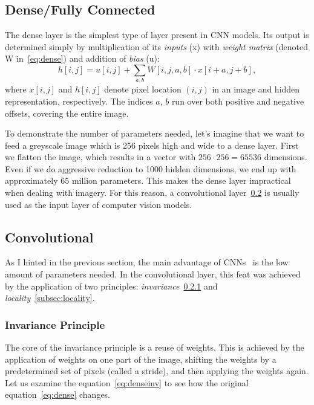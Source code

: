 \subsection{Dense/Fully Connected}\label{subsec:dense}
The dense layer is the simplest type of layer present in CNN models.
Its output is determined simply by multiplication of its \textit{inputs} (x) with \textit{weight matrix}
(denoted W in~\ref{eq:dense}) and addition of \textit{bias} (u):
\begin{equation}
    \label{eq:dense}
    h[i, j] = u[i,j] + \sum_{a,b} W[i,j,a,b] \cdot x[i+a,j+b],
\end{equation}
where $x\left[ i, j \right]$ and $h\left[ i, j \right]$ denote pixel location $\left( i, j \right)$ in an image and
hidden representation, respectively.
The indices $a$, $b$ run over both positive and negative offsets, covering the entire image.

To demonstrate the number of parameters needed, let's imagine that we want to feed a greyscale image which is 256 pixels
high and wide to a dense layer.
First we flatten the image, which results in a vector with $256\cdot256 = 65536$ dimensions.
Even if we do aggressive reduction to 1000 hidden dimensions, we end up with approximately 65 million parameters.
This makes the dense layer impractical when dealing with imagery.
For this reason, a convolutional layer~\ref{subsec:convolutional} is usually used as the input layer of computer
vision models.

\subsection{Convolutional}\label{subsec:convolutional}
As I hinted in the previous section, the main advantage of CNNs~\cite{ConvLayer} is the low amount of parameters needed.
In the convolutional layer, this feat was achieved by the application of two principles:
\textit{invariance}~\ref{subsec:invariance} and \textit{locality}~\ref{subsec:locality}.

\subsubsection{Invariance Principle}\label{subsec:invariance}
The core of the invariance principle is a reuse of weights.
This is achieved by the application of weights on one part of the image, shifting the weights by a predetermined set
of pixels (called a stride), and then applying the weights again.
Let us examine the equation~\ref{eq:denseinv} to see how the original equation~\ref{eq:dense} changes.

